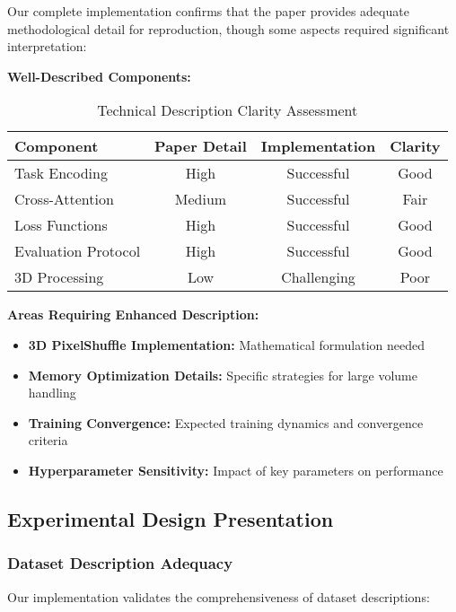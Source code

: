 Our complete implementation confirms that the paper provides adequate methodological detail for reproduction, though some aspects required significant interpretation:

\textbf{Well-Described Components:}
\begin{table}[h]
\centering
\small
\begin{tabular}{|l|c|c|c|}
\hline
\textbf{Component} & \textbf{Paper Detail} & \textbf{Implementation} & \textbf{Clarity} \\
\hline
Task Encoding & High & Successful & \textcolor{validatedgreen}{Good} \\
Cross-Attention & Medium & Successful & \textcolor{warningorange}{Fair} \\
Loss Functions & High & Successful & \textcolor{validatedgreen}{Good} \\
Evaluation Protocol & High & Successful & \textcolor{validatedgreen}{Good} \\
3D Processing & Low & Challenging & \textcolor{errorred}{Poor} \\
\hline
\end{tabular}
\caption{Technical Description Clarity Assessment}
\label{tab:clarity_assessment}
\end{table}

\textbf{Areas Requiring Enhanced Description:}
\begin{itemize}
    \item \textbf{3D PixelShuffle Implementation:} Mathematical formulation needed
    \item \textbf{Memory Optimization Details:} Specific strategies for large volume handling
    \item \textbf{Training Convergence:} Expected training dynamics and convergence criteria
    \item \textbf{Hyperparameter Sensitivity:} Impact of key parameters on performance
\end{itemize}

\subsection{Experimental Design Presentation}

\subsubsection*{Dataset Description Adequacy}
Our implementation validates the comprehensiveness of dataset descriptions:

